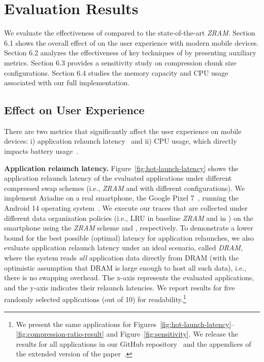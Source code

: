 \section{Evaluation Results}
\label{sec:evel}
We evaluate the effectiveness of \proposal compared to the state-of-the-art \emph{ZRAM}. Section 6.1 shows the overall effect of \proposal on the user experience with modern mobile devices. Section 6.2 analyzes the effectiveness of key techniques of \proposal by presenting auxiliary metrics.
Section 6.3 provides a sensitivity study on compression chunk size configurations. Section 6.4 studies the memory capacity and CPU usage associated
with our full \proposal implementation.


\subsection{Effect on User Experience} 
\label{sec:userexperience}
 
There are two metrics that significantly affect the user experience on mobile devices: i) application relaunch latency~\cite{end2024more,lebeck2020end} and ii) CPU usage, which directly impacts battery usage~\cite{pramanik2019power}.


\noindent\textbf{Application relaunch latency.} 
Figure~\ref{fig:hot-launch-latency} shows the application relaunch latency of the evaluated applications under different compressed swap schemes (i.e., \emph{ZRAM} and \proposal with different configurations).  We implement Ariadne on a real smartphone, the Google Pixel 7~\cite{Pixel7}, running the Android 14 operating system~\cite{Android14}. We execute our traces that are collected under different data organization policies (i.e., LRU in baseline \emph{ZRAM} and \dataorg in \proposal) on the smartphone using the \emph{ZRAM} scheme and \proposal, respectively. To demonstrate a lower bound for the best possible (optimal) latency for application relaunches, we also evaluate application relaunch latency under an ideal scenario, called \emph{DRAM}, where the system reads \emph{all} application data directly from DRAM (with the optimistic assumption that DRAM is large enough to host all such data), i.e., there is no swapping overhead. The x-axis represents the evaluated applications, and the y-axis indicates their relaunch latencies.
We report results for five randomly selected applications (out of 10) for readability.\footnote{ We present the same applications for Figures~\ref{fig:hot-launch-latency}–\ref{fig:compression-ratio-result} and Figure~\ref{fig:sensitivity}. We release the results for all applications in our GitHub repository~\cite{github} and the appendices of the extended version of the paper~\cite{LiangAxiv}.}



